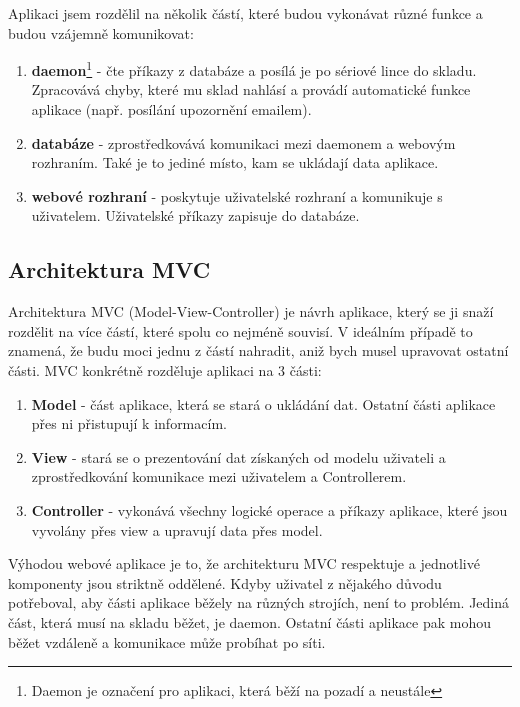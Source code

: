 \documentclass[12pt, a4paper, oneside]{article}
\begin{document}
Aplikaci jsem rozdělil na několik částí, které budou vykonávat různé funkce a budou vzájemně komunikovat:
\begin{enumerate}
\item \textbf{daemon}\footnote{Daemon je označení pro aplikaci, která běží na pozadí a neustále} - čte příkazy z databáze a posílá je po sériové lince do skladu. Zpracovává chyby, které mu sklad nahlásí a provádí automatické funkce aplikace (např. posílání upozornění emailem).
\item \textbf{databáze} - zprostředkovává komunikaci mezi daemonem a webovým rozhraním. Také je to jediné místo, kam se ukládají data aplikace.
\item \textbf{webové rozhraní} - poskytuje uživatelské rozhraní a komunikuje s uživatelem. Uživatelské příkazy zapisuje do databáze.
\end{enumerate}

\subsection{Architektura MVC}

Architektura MVC (Model-View-Controller) je návrh aplikace, který se ji snaží rozdělit na více částí, které spolu co nejméně souvisí.
V ideálním případě to znamená, že budu moci jednu z částí nahradit, aniž bych musel upravovat ostatní části.
MVC konkrétně rozděluje aplikaci na 3 části:

\begin{enumerate}
\item \textbf{Model} - část aplikace, která se stará o ukládání dat. Ostatní části aplikace přes ni přistupují k informacím.
\item \textbf{View} - stará se o prezentování dat získaných od modelu uživateli a zprostředkování komunikace mezi uživatelem a Controllerem.
\item \textbf{Controller} - vykonává všechny logické operace a příkazy aplikace, které jsou vyvolány přes view a upravují data přes model.
\end{enumerate}

Výhodou webové aplikace je to, že architekturu MVC respektuje a jednotlivé komponenty jsou striktně oddělené. Kdyby uživatel z nějakého důvodu potřeboval, aby části aplikace běžely na různých strojích, není to problém. Jediná část, která musí na skladu běžet, je daemon. Ostatní části aplikace pak mohou běžet vzdáleně a komunikace může probíhat po síti.

\newpage
\end{document}
